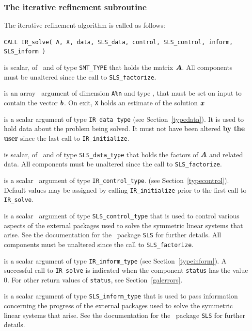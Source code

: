 \documentclass{galahad}
\newcommand{\packagename}{IR}
\begin{document}

\subsubsection{The iterative refinement subroutine}
The iterative refinement algorithm is called as follows:

\hskip0.5in
{\tt CALL \packagename\_solve( A, X, data, SLS\_data, control, SLS\_control,  inform, SLS\_inform )}

\begin{description}

 is scalar, of \intentin\ and of type {\tt SMT\_TYPE} that holds
the matrix ${\bm{A}}$.  All components must be unaltered since the call
to {\tt SLS\_factorize}.

 is an array \intentinout\ argument of dimension {\tt A\%n} and
type \realdp, that must be set on input to contain the vector ${\bm{b}}$.
On exit, {\tt X} holds an estimate of the solution ${\bm{x}}$

 is a scalar \intentinout argument of type
{\tt \packagename\_data\_type}
(see Section~\ref{typedata}). It is used to hold data about the problem being
solved. It must not have been altered {\bf by the user} since the last call to
{\tt \packagename\_initialize}.

 is scalar, of \intentinout\ and of type {\tt SLS\_data\_type}
that holds the factors of ${\bm{A}}$ and related data.
All components must be unaltered since the call to {\tt SLS\_factorize}.

 is a scalar \intentin\ argument of type
{\tt \packagename\_control\_type}.
(see Section~\ref{typecontrol}).
Default values may be assigned by calling {\tt \packagename\_initialize}
prior to the first call to {\tt \packagename\_solve}.

 is a scalar \intentin\ argument of type
{\tt SLS\_control\_type} that is used to control various aspects of the
external packages used to solve the symmetric linear systems that arise.
See the documentation for the \galahad\ package {\tt SLS} for further details.
All components must be unaltered since the call to {\tt SLS\_factorize}.

 is a scalar \intentinout argument of type
{\tt \packagename\_inform\_type}
(see Section~\ref{typeinform}).
A successful call to
{\tt \packagename\_solve}
is indicated when the  component {\tt status} has the value 0.
For other return values of {\tt status}, see Section~\ref{galerrors}.

 is a scalar \intentinout argument of type
{\tt SLS\_inform\_type} that is used to pass information
concerning the progress of the external packages used to solve the symmetric
linear systems that arise.
See the documentation for the \galahad\ package {\tt SLS} for further details.

\end{description}
\end{document}
